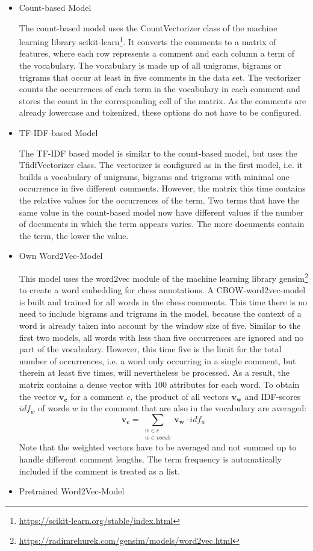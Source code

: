 \documentclass[article,type=msc,colorback,accentcolor=tud7b]{tudthesis}
\begin{document}
    \begin{itemize}
      \item Count-based Model

        The count-based model uses the CountVectorizer class of the machine learning library scikit-learn\footnote{\url{https://scikit-learn.org/stable/index.html}}. It converts the comments to a matrix of features, where each row represents a comment and each column a term of the vocabulary. The vocabulary is made up of all unigrams, bigrams or trigrams that occur at least in five comments in the data set. The vectorizer counts the occurrences of each term in the vocabulary in each comment and stores the count in the corresponding cell of the matrix. As the comments are already lowercase and tokenized, these options do not have to be configured.
      \item TF-IDF-based Model

        The TF-IDF based model is similar to the count-based model, but uses the TfidfVectorizer class. The vectorizer is configured as in the first model, i.e. it builds a vocabulary of unigrams, bigrams and trigrams with minimal one occurrence in five different comments. However, the matrix this time contains the relative values for the occurrences of the term. Two terms that have the same value in the count-based model now have different values if the number of documents in which the term appears varies. The more documents contain the term, the lower the value.
      \item Own Word2Vec-Model

        This model uses the word2vec module of the machine learning library gensim\footnote{\url{https://radimrehurek.com/gensim/models/word2vec.html}} to create a word embedding for chess annotations. A CBOW-word2vec-model is built and trained for all words in the chess comments. This time there is no need to include bigrams and trigrams in the model, because the context of a word is already taken into account by the window size of five. Similar to the first two models, all words with less than five occurrences are ignored and no part of the vocabulary. However, this time five is the limit for the total number of occurrences, i.e. a word only occurring in a single comment, but therein at least five times, will nevertheless be processed. As a result, the matrix contains a dense vector with 100 attributes for each word. To obtain the vector $\mathbf{v_{c}}$ for a comment $c$, the product of all vectors $\mathbf{v_{w}}$ and IDF-scores $idf_{w}$ of words $w$ in the comment that are also in the vocabulary are averaged:
        \[\mathbf{v_{c}}=\sum_{\substack{w\in c\\w\in vocab}}\mathbf{v_{w}}\cdot idf_{w}\]
        Note that the weighted vectors have to be averaged and not summed up to handle different comment lengths. The term frequency is automatically included if the comment is treated as a list.
      \item Pretrained Word2Vec-Model


\end{itemize}
\end{document}

